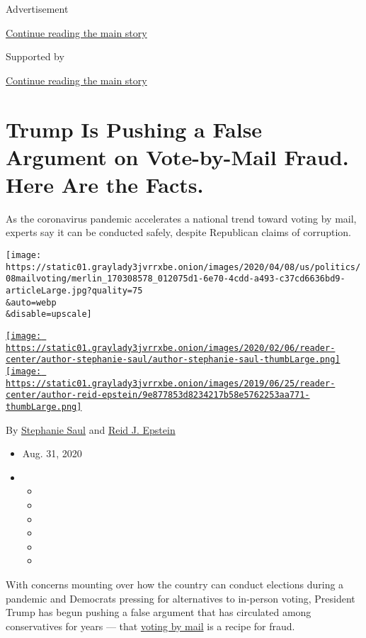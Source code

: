 Advertisement

\protect\hyperlink{after-top}{Continue reading the main story}

Supported by

\protect\hyperlink{after-sponsor}{Continue reading the main story}

\hypertarget{trump-is-pushing-a-false-argument-on-vote-by-mail-fraud-here-are-the-facts}{%
\section{Trump Is Pushing a False Argument on Vote-by-Mail Fraud. Here
Are the
Facts.}\label{trump-is-pushing-a-false-argument-on-vote-by-mail-fraud-here-are-the-facts}}

As the coronavirus pandemic accelerates a national trend toward voting
by mail, experts say it can be conducted safely, despite Republican
claims of corruption.

\texttt{[image: https://static01.graylady3jvrrxbe.onion/images/2020/04/08/us/politics/08mailvoting/merlin\_170308578\_012075d1-6e70-4cdd-a493-c37cd6636bd9-articleLarge.jpg?quality=75\\\&auto=webp\\\&disable=upscale]}

\href{https://www.nytimes3xbfgragh.onion/by/stephanie-saul}{\texttt{[image: https://static01.graylady3jvrrxbe.onion/images/2020/02/06/reader-center/author-stephanie-saul/author-stephanie-saul-thumbLarge.png]}}\href{https://www.nytimes3xbfgragh.onion/by/reid-j-epstein}{\texttt{[image: https://static01.graylady3jvrrxbe.onion/images/2019/06/25/reader-center/author-reid-epstein/9e877853d8234217b58e5762253aa771-thumbLarge.png]}}

By \href{https://www.nytimes3xbfgragh.onion/by/stephanie-saul}{Stephanie
Saul} and
\href{https://www.nytimes3xbfgragh.onion/by/reid-j-epstein}{Reid J.
Epstein}

\begin{itemize}
\item
  Aug. 31, 2020
\item
  \begin{itemize}
  \item
  \item
  \item
  \item
  \item
  \item
  \end{itemize}
\end{itemize}

With concerns mounting over how the country can conduct elections during
a pandemic and Democrats pressing for alternatives to in-person voting,
President Trump has begun pushing a false argument that has circulated
among conservatives for years --- that
\href{https://www.nytimes3xbfgragh.onion/2020/09/08/us/politics/georgia-double-voting.html}{voting
by mail} is a recipe for fraud.


